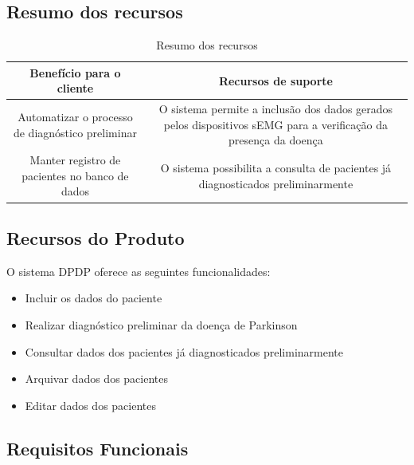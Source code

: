 \begin{anexosenv}
	\subsection{Resumo dos recursos}

	\begin{table}[]
		\centering
		\caption{Resumo dos recursos}
		\begin{tabular}{@{}|c|c|@{}}
			\toprule
			\textbf{Benefício para o cliente}                & \textbf{Recursos de suporte}                                                                                    \\ \midrule
			Automatizar o processo de diagnóstico preliminar & O sistema permite a inclusão dos dados gerados pelos dispositivos sEMG para a verificação da presença da doença \\ \midrule
			Manter registro de pacientes no banco de dados   & O sistema possibilita a consulta de pacientes já diagnosticados preliminarmente                                 \\ \bottomrule
		\end{tabular}
		\label{table:Resumo dos recursos}
	\end{table}

	\subsection{Recursos do Produto}

	O sistema DPDP oferece as seguintes funcionalidades:

	\begin{itemize}
		\item Incluir os dados do paciente
		\item Realizar diagnóstico preliminar da doença de Parkinson
		\item Consultar dados dos pacientes já diagnosticados preliminarmente
		\item Arquivar dados dos pacientes
		\item Editar dados dos pacientes
	\end{itemize}

	\subsection{Requisitos Funcionais}


\end{anexosenv}
